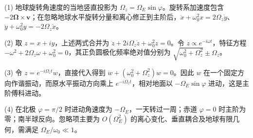 (1) 地球旋转角速度的当地竖直投影为 $\Omega_z=\Omega_E\sin\varphi$。旋转系加速度包含 $-2\boldsymbol\Omega\times\mathbf v$；在忽略地球水平旋转分量和离心修正到主阶后，$\ddot x+\omega_0^2x=2\Omega_z\dot y$、$\ddot y+\omega_0^2y=-2\Omega_z\dot x$。

(2) 取 $z=x+iy$，上述两式合并为 $\ddot z+2i\Omega_z\dot z+\omega_0^2z=0$。令 $z\propto e^{-i\omega t}$，特征方程 $-\omega^2+2\Omega_z\omega+\omega_0^2=0$，其正负圆极化频率绝对值分别为 $\sqrt{\omega_0^2+\Omega_z^2}\pm\Omega_z$。

(3) 令 $z=e^{-i\Omega_zt}w$，直接代入得到 $\ddot w+(\omega_0^2+\Omega_z^2)w=0$。因此 $w$ 在一个固定方向作谐振动，而原水平振动方向乘上 $e^{-i\Omega_zt}$，相对地面以 $-\Omega_E\sin\varphi$ 进动，这是主阶傅科进动。

(4) 在北极 $\varphi=\pi/2$ 时进动角速度为 $-\Omega_E$，一天转过一周；赤道 $\varphi=0$ 时主阶为零；南半球反向。忽略项主要为 $O(\Omega_E^2)$ 的离心变化、垂直耦合及地球有限几何，需满足 $\Omega_E/\omega_0\ll1$。
